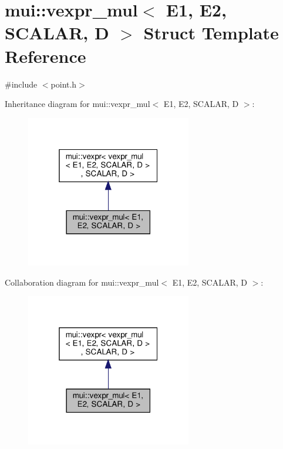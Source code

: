 \hypertarget{structmui_1_1vexpr__mul}{}\section{mui\+:\+:vexpr\+\_\+mul$<$ E1, E2, S\+C\+A\+L\+AR, D $>$ Struct Template Reference}
\label{structmui_1_1vexpr__mul}


{\ttfamily \#include $<$point.\+h$>$}



Inheritance diagram for mui\+:\+:vexpr\+\_\+mul$<$ E1, E2, S\+C\+A\+L\+AR, D $>$\+:
\nopagebreak
\begin{figure}[H]
\begin{center}
\leavevmode
\includegraphics[width=205pt]{structmui_1_1vexpr__mul__inherit__graph}
\end{center}
\end{figure}


Collaboration diagram for mui\+:\+:vexpr\+\_\+mul$<$ E1, E2, S\+C\+A\+L\+AR, D $>$\+:
\nopagebreak
\begin{figure}[H]
\begin{center}
\leavevmode
\includegraphics[width=205pt]{structmui_1_1vexpr__mul__coll__graph}
\end{center}
\end{figure}
